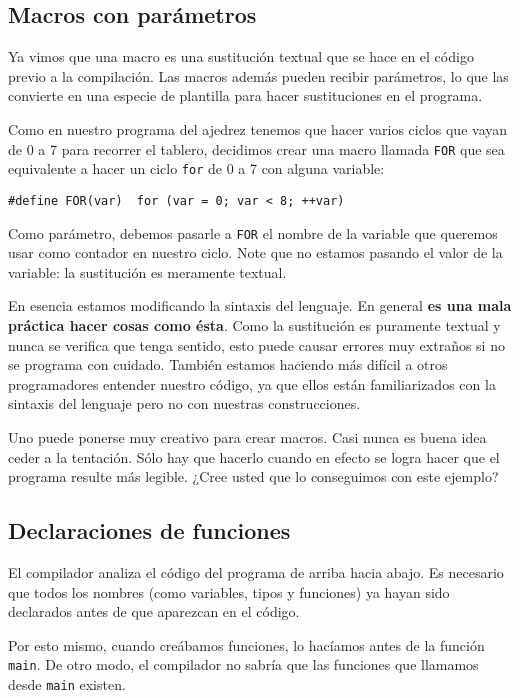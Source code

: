\subsection{Macros con parámetros}

Ya vimos que una macro es una sustitución textual que se hace en el
código previo a la compilación. Las macros además pueden recibir
parámetros, lo que las convierte en una especie de plantilla para hacer
sustituciones en el programa.

Como en nuestro programa del ajedrez tenemos que hacer varios ciclos que
vayan de 0 a 7 para recorrer el tablero, decidimos crear una macro
llamada \lstinline!FOR! que sea equivalente a hacer un ciclo
\lstinline!for! de 0 a 7 con alguna variable:

\begin{lstlisting}
#define FOR(var)  for (var = 0; var < 8; ++var)
\end{lstlisting}

Como parámetro, debemos pasarle a \lstinline!FOR! el nombre de la
variable que queremos usar como contador en nuestro ciclo. Note que no
estamos pasando el valor de la variable: la sustitución es meramente
textual.

En esencia estamos modificando la sintaxis del lenguaje. En general
\textbf{es una mala práctica hacer cosas como ésta}. Como la sustitución
es puramente textual y nunca se verifica que tenga sentido, esto puede
causar errores muy extraños si no se programa con cuidado. También
estamos haciendo más difícil a otros programadores entender nuestro
código, ya que ellos están familiarizados con la sintaxis del lenguaje
pero no con nuestras construcciones.

Uno puede ponerse muy creativo para crear macros. Casi nunca es buena
idea ceder a la tentación. Sólo hay que hacerlo cuando en efecto se
logra hacer que el programa resulte más legible. ¿Cree usted que lo
conseguimos con este ejemplo?

\subsection{Declaraciones de funciones}

El compilador analiza el código del programa de arriba hacia abajo. Es
necesario que todos los nombres (como variables, tipos y funciones) ya
hayan sido declarados antes de que aparezcan en el código.

Por esto mismo, cuando creábamos funciones, lo hacíamos antes de la
función \lstinline!main!. De otro modo, el compilador no sabría que las
funciones que llamamos desde \lstinline!main! existen.


